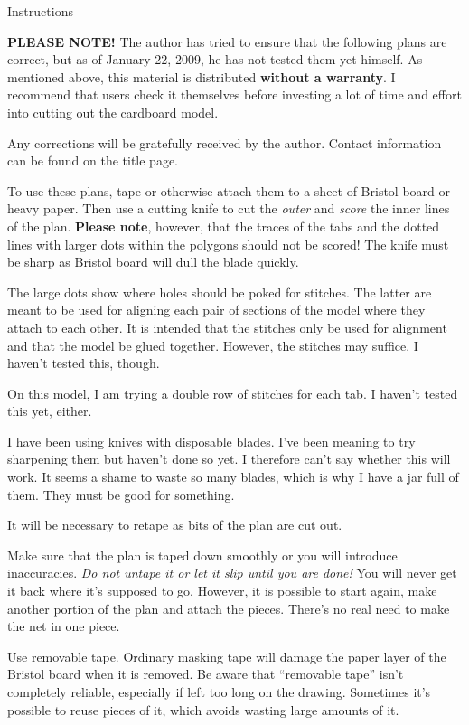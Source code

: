 
\centerline{{\largebx Instructions}}
\baselineskip

{\bf PLEASE NOTE!}  The author has tried to ensure that the following
plans are correct, but as of January 22, 2009, he has not tested them
yet himself.  As mentioned above, this material is distributed {\bf without
a warranty}.  I recommend that users check it themselves before
investing a lot of time and effort into cutting out the cardboard model.

Any corrections will be gratefully received by the author.  Contact
information can be found on the title page.

To use these plans, tape or otherwise attach them to a sheet of
Bristol board or heavy paper.  Then use a cutting knife to cut the
{\it outer\/} and {\it score\/} the inner lines of the plan.  
{\bf Please note}, however, that the traces of the tabs and the dotted lines
with larger dots within the polygons should not be scored!  
The knife must be sharp as Bristol board will dull the blade quickly.

The large dots show where holes should be poked for stitches.  The latter are
meant to be used for aligning each pair of sections of the model where they
attach to each other.  It is intended that the stitches only be used for 
alignment and that the model be glued together.  However, the stitches may 
suffice.  I haven't tested this, though.

On this model, I am trying a double row of stitches for each tab.  I haven't 
tested this yet, either.


I have been using knives with disposable blades.  I've been meaning to
try sharpening them but haven't done so yet.  I therefore can't say
whether this will work.  It seems a shame to waste so many blades,
which is why I have a jar full of them.  They must be good for
something. 

It will be necessary to retape as bits of the plan are cut out.

Make sure that the plan is taped down smoothly or you will introduce
inaccuracies.  {\it Do not untape it or let it slip until you are
done!\/}  You will never get it back where it's supposed to go.
However, it is possible to start again, make another portion of the
plan and attach the pieces.  There's no real need to make the net in
one piece.

Use removable tape.  Ordinary masking tape will damage the paper layer of the
Bristol board when it is removed.  Be aware that ``removable tape'' isn't
completely reliable, especially if left too long on the drawing.  Sometimes
it's possible to reuse pieces of it, which avoids wasting large amounts of
it. 

